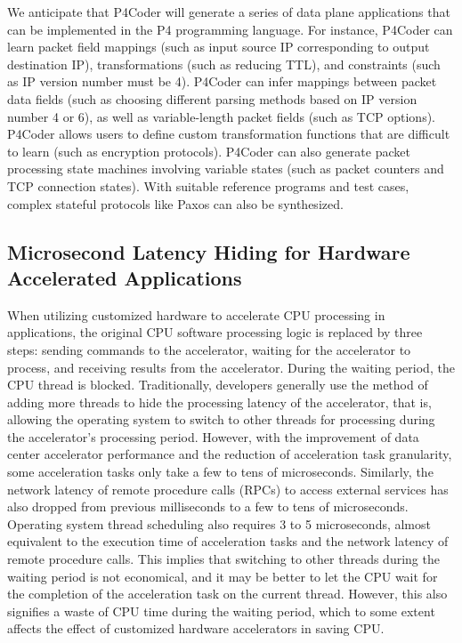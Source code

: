 We anticipate that P4Coder will generate a series of data plane applications that can be implemented in the P4 programming language. For instance, P4Coder can learn packet field mappings (such as input source IP corresponding to output destination IP), transformations (such as reducing TTL), and constraints (such as IP version number must be 4). P4Coder can infer mappings between packet data fields (such as choosing different parsing methods based on IP version number 4 or 6), as well as variable-length packet fields (such as TCP options). P4Coder allows users to define custom transformation functions that are difficult to learn (such as encryption protocols). P4Coder can also generate packet processing state machines involving variable states (such as packet counters and TCP connection states). With suitable reference programs and test cases, complex stateful protocols like Paxos can also be synthesized.

\subsection{Microsecond Latency Hiding for Hardware Accelerated Applications}

When utilizing customized hardware to accelerate CPU processing in applications, the original CPU software processing logic is replaced by three steps: sending commands to the accelerator, waiting for the accelerator to process, and receiving results from the accelerator. During the waiting period, the CPU thread is blocked. Traditionally, developers generally use the method of adding more threads to hide the processing latency of the accelerator, that is, allowing the operating system to switch to other threads for processing during the accelerator's processing period. However, with the improvement of data center accelerator performance and the reduction of acceleration task granularity, some acceleration tasks only take a few to tens of microseconds. Similarly, the network latency of remote procedure calls (RPCs) to access external services has also dropped from previous milliseconds to a few to tens of microseconds. Operating system thread scheduling also requires 3 to 5 microseconds, almost equivalent to the execution time of acceleration tasks and the network latency of remote procedure calls. This implies that switching to other threads during the waiting period is not economical, and it may be better to let the CPU wait for the completion of the acceleration task on the current thread. However, this also signifies a waste of CPU time during the waiting period, which to some extent affects the effect of customized hardware accelerators in saving CPU.

